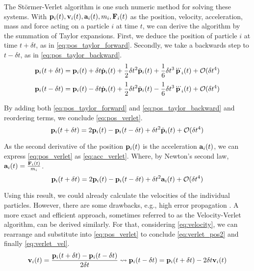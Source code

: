 The Störmer-Verlet algorithm is one such numeric method for solving these systems.
With $\mathbf{p}_i(t), \mathbf{v}_i(t), \mathbf{a}_i(t), m_i, \mathbf{F}_i(t)$ as the position, velocity, acceleration, mass and force acting on a particle $i$ at time $t$, we can derive the algorithm by the summation of Taylor expansions. First, we deduce the position of particle $i$ at time $t+\delta t$, as in \eqref{eq:pos_taylor_forward}. Secondly, we take a backwards step to $t-\delta t$, as in \eqref{eq:pos_taylor_backward}.
\begin{equation}
	\mathbf{p}_i(t+\delta t) = \mathbf{p}_i(t)+\delta t\dot{\mathbf{p}}_i(t)+\frac{1}{2}\delta t^2\ddot{\mathbf{p}}_i(t)+\frac{1}{6}\delta t^3\dddot{\mathbf{p}}_i(t)+\mathcal{O}(\delta t^4)\label{eq:pos_taylor_forward}
\end{equation}
\begin{equation}
	\mathbf{p}_i(t-\delta t) = \mathbf{p}_i(t)-\delta t\dot{\mathbf{p}}_i(t)+\frac{1}{2}\delta t^2\ddot{\mathbf{p}}_i(t)-\frac{1}{6}\delta t^3\dddot{\mathbf{p}}_i(t)+\mathcal{O}(\delta t^4)\label{eq:pos_taylor_backward}
\end{equation}

By adding both \eqref{eq:pos_taylor_forward} and \eqref{eq:pos_taylor_backward} and reordering terms, we conclude \eqref{eq:pos_verlet}.
\begin{equation}
\mathbf{p}_i(t+\delta t) = 2\mathbf{p}_i(t) - \mathbf{p}_i(t-\delta t) + \delta t^2\ddot{\mathbf{p}}_i(t) + \mathcal{O}(\delta t^4)\label{eq:pos_verlet}
\end{equation}

As the second derivative of the position $\mathbf{p}_i(t)$ is the acceleration $\mathbf{a}_i(t)$, we can express \eqref{eq:pos_verlet} as \eqref{eq:acc_verlet}. Where, by Newton's second law, $\mathbf{a}_i(t) = \frac{\mathbf{F}_i(t)}{m_i}$.
\begin{equation}
	\mathbf{p}_i(t+\delta t) = 2\mathbf{p}_i(t) - \mathbf{p}_i(t-\delta t) + \delta t^2{\mathbf{a}}_i(t) + \mathcal{O}(\delta t^4)\label{eq:acc_verlet}
\end{equation}

Using this result, we could already calculate the velocities of the individual particles. However, there are some drawbacks, e.g., high error propagation \cite{Fulst2013}. A more exact and efficient approach, sometimes referred to as the Velocity-Verlet algorithm, can be derived similarly.
For that, considering \eqref{eq:velocity}, we can rearrange and substitute into \eqref{eq:pos_verlet} to conclude \eqref{eq:verlet_pos2} and finally \eqref{eq:verlet_vel}.
\begin{equation}
	\mathbf{v}_i(t) = \frac{\mathbf{p}_i(t+\delta t) -\mathbf{p}_i(t-\delta t)}{2\delta t} \rightsquigarrow \mathbf{p}_i(t-\delta t)= \mathbf{p}_i(t+\delta t)-2\delta t \mathbf{v}_i(t) \label{eq:velocity}
\end{equation}

